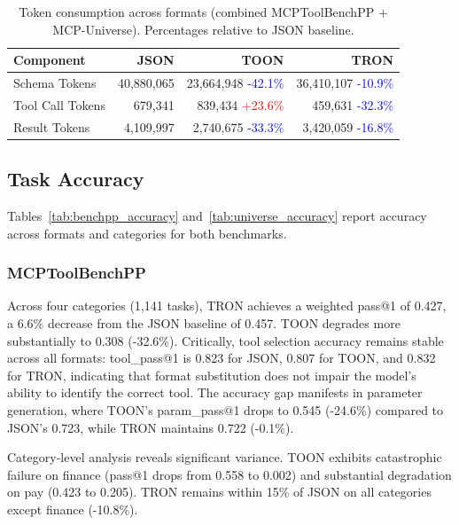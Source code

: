 \documentclass[11pt]{article}
\begin{document}
\begin{table}[t]
    \centering
    \footnotesize
    \caption{Token consumption across formats (combined MCPToolBenchPP + MCP-Universe). Percentages relative to JSON baseline.}
    \label{tab:token_usage}
    \begin{tabular}{@{}lrrr@{}}
        \toprule
        \textbf{Component} & \textbf{JSON} & \textbf{TOON} & \textbf{TRON} \\
        \midrule
        Schema Tokens & 40,880,065 & 23,664,948 {\scriptsize\textcolor{blue}{-42.1\%}} & 36,410,107 {\scriptsize\textcolor{blue}{-10.9\%}} \\
        Tool Call Tokens & 679,341 & 839,434 {\scriptsize\textcolor{red}{+23.6\%}} & 459,631 {\scriptsize\textcolor{blue}{-32.3\%}} \\
        Result Tokens & 4,109,997 & 2,740,675 {\scriptsize\textcolor{blue}{-33.3\%}} & 3,420,059 {\scriptsize\textcolor{blue}{-16.8\%}} \\
        \bottomrule
    \end{tabular}
\end{table}


\subsection{Task Accuracy}
\label{sec:accuracy}

Tables~\ref{tab:benchpp_accuracy} and~\ref{tab:universe_accuracy} report accuracy across formats and categories for both benchmarks.

\subsubsection{MCPToolBenchPP}
Across four categories (1,141 tasks), TRON achieves a weighted pass@1 of 0.427, a 6.6\% decrease from the JSON baseline of 0.457. TOON degrades more substantially to 0.308 (-32.6\%). Critically, tool selection accuracy remains stable across all formats: tool\_pass@1 is 0.823 for JSON, 0.807 for TOON, and 0.832 for TRON, indicating that format substitution does not impair the model's ability to identify the correct tool. The accuracy gap manifests in parameter generation, where TOON's param\_pass@1 drops to 0.545 (-24.6\%) compared to JSON's 0.723, while TRON maintains 0.722 (-0.1\%).

Category-level analysis reveals significant variance. TOON exhibits catastrophic failure on finance (pass@1 drops from 0.558 to 0.002) and substantial degradation on pay (0.423 to 0.205). TRON remains within 15\% of JSON on all categories except finance (-10.8\%).
\end{document}
